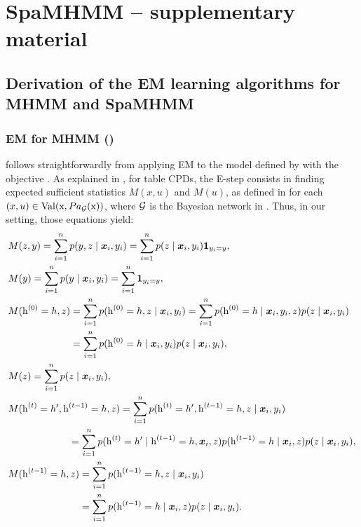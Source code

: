 
\chapter{SpaMHMM -- supplementary material} %

\label{appendix:spamhmm} %

\section{Derivation of the EM learning algorithms for MHMM and SpaMHMM}

\subsection{EM for MHMM ()}
\label{sec:proof_em_noreg}
 follows straightforwardly from applying EM to the model defined by  with the objective . As explained in , for table CPDs, the E-step consists in finding expected sufficient statistics $M(x, u)$ and $M(u)$, as defined in  for each $(x, u) \in \mathrm{Val}({\textnormal{x}},  Pa_{\mathcal{G}}({\textnormal{x}}))$, where ${\mathcal{G}}$ is the Bayesian network in . Thus, in our setting, those equations yield:
\begingroup
\allowdisplaybreaks
\begin{align}
	&M(z,y) = \sum_{i=1}^{n} p(y, z \mid \vx_i, y_i) = \sum_{i=1}^{n} p(z \mid \vx_i, y_i) \1_{y_i=y}, \\
	&M(y) = \sum_{i=1}^{n} p(y \mid \vx_i, y_i) = \sum_{i=1}^{n} \1_{y_i=y}, \\
	&M(\rh^{(0)}=h, z) = \sum_{i=1}^{n} p(\rh^{(0)}=h, z \mid \vx_i, y_i) = \sum_{i=1}^{n} p(\rh^{(0)}=h \mid \vx_i, y_i, z) p(z \mid \vx_i, y_i) \nonumber\\
	&\hphantom{M(\rh^{(0)}=h,z)} = \sum_{i=1}^{n} p(\rh^{(0)}=h \mid \vx_i, y_i) p(z \mid \vx_i, y_i), \\
	&M(z) = \sum_{i=1}^{n} p(z \mid \vx_i, y_i), \\
	&M(\rh^{(t)}=h', \rh^{(t-1)}=h, z) = \sum_{i=1}^{n} p(\rh^{(t)}=h', \rh^{(t-1)}=h, z \mid \vx_i, y_i) \nonumber\\
	&\hphantom{M(\rh^{(t-1)}=h, } = \sum_{i=1}^{n} p(\rh^{(t)}=h' \mid \rh^{(t-1)}=h, \vx_i, z) p(\rh^{(t-1)}=h \mid \vx_i, z) p(z \mid \vx_i, y_i), \\
	&M(\rh^{(t-1)}=h, z) = \sum_{i=1}^{n} p(\rh^{(t-1)}=h, z \mid \vx_i, y_i) \nonumber\\
	&\hphantom{M(\rh^{(t-1)}=h, z)} = \sum_{i=1}^{n} p(\rh^{(t-1)}=h \mid \vx_i, z) p(z \mid \vx_i, y_i).
\end{align}
